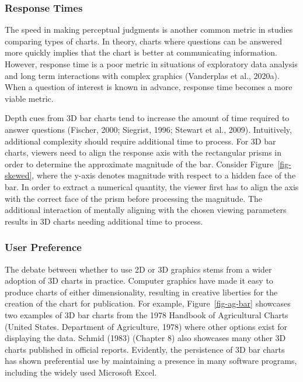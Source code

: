 \documentclass[phd]{nuthesis}
\begin{document}
\subsubsection{Response Times}\label{response-times}

The speed in making perceptual judgments is another common metric in
studies comparing types of charts. In theory, charts where questions can
be answered more quickly implies that the chart is better at
communicating information. However, response time is a poor metric in
situations of exploratory data analysis and long term interactions with
complex graphics (Vanderplas et al., 2020a). When a question of interest
is known in advance, response time becomes a more viable metric.

Depth cues from 3D bar charts tend to increase the amount of time
required to answer questions (Fischer, 2000; Siegrist, 1996; Stewart et
al., 2009). Intuitively, additional complexity should require additional
time to process. For 3D bar charts, viewers need to align the response
axis with the rectangular prisms in order to determine the approximate
magnitude of the bar. Consider Figure~\ref{fig-skewed}, where the y-axis
denotes magnitude with respect to a hidden face of the bar. In order to
extract a numerical quantity, the viewer first has to align the axis
with the correct face of the prism before processing the magnitude. The
additional interaction of mentally aligning with the chosen viewing
parameters results in 3D charts needing additional time to process.

\subsubsection{User Preference}\label{user-preference}

The debate between whether to use 2D or 3D graphics stems from a wider
adoption of 3D charts in practice. Computer graphics have made it easy
to produce charts of either dimensionality, resulting in creative
liberties for the creation of the chart for publication. For example,
Figure~\ref{fig-ag-bar} showcases two examples of 3D bar charts from the
1978 Handbook of Agricultural Charts (United States. Department of
Agriculture, 1978) where other options exist for displaying the data.
Schmid (1983) (Chapter 8) also showcases many other 3D charts published
in official reports. Evidently, the persistence of 3D bar charts has
shown preferential use by maintaining a presence in many software
programs, including the widely used Microsoft Excel.
\end{document}
